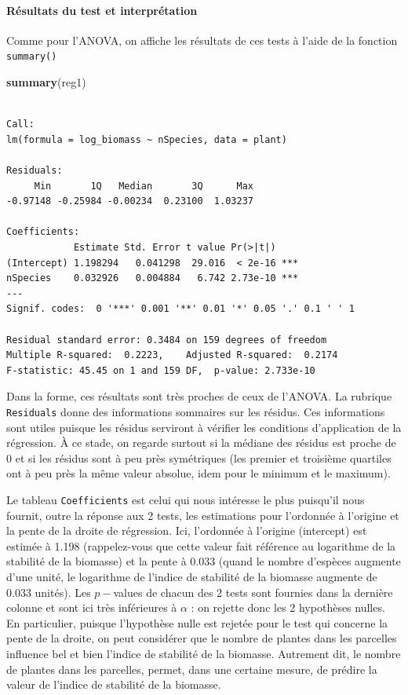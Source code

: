 \documentclass[a4paperpaper,]{article}
\newenvironment{Shaded}{\begin{snugshade}}{\end{snugshade}}
\newcommand{\KeywordTok}[1]{\textcolor[rgb]{0.12,0.11,0.11}{\textbf{#1}}}
\newcommand{\NormalTok}[1]{\textcolor[rgb]{0.12,0.11,0.11}{#1}}
\let\oldparagraph\paragraph
\renewcommand{\paragraph}[1]{\oldparagraph{#1}\mbox{}}
\begin{document}
\hypertarget{ruxe9sultats-du-test-et-interpruxe9tation-1}{%
\paragraph{Résultats du test et interprétation}\label{ruxe9sultats-du-test-et-interpruxe9tation-1}}

Comme pour l'ANOVA, on affiche les résultats de ces tests à l'aide de la fonction \texttt{summary()}

\begin{Shaded}
\begin{Highlighting}[]
\KeywordTok{summary}\NormalTok{(reg1)}
\end{Highlighting}
\end{Shaded}

\begin{verbatim}

Call:
lm(formula = log_biomass ~ nSpecies, data = plant)

Residuals:
     Min       1Q   Median       3Q      Max 
-0.97148 -0.25984 -0.00234  0.23100  1.03237 

Coefficients:
            Estimate Std. Error t value Pr(>|t|)    
(Intercept) 1.198294   0.041298  29.016  < 2e-16 ***
nSpecies    0.032926   0.004884   6.742 2.73e-10 ***
---
Signif. codes:  0 '***' 0.001 '**' 0.01 '*' 0.05 '.' 0.1 ' ' 1

Residual standard error: 0.3484 on 159 degrees of freedom
Multiple R-squared:  0.2223,    Adjusted R-squared:  0.2174 
F-statistic: 45.45 on 1 and 159 DF,  p-value: 2.733e-10
\end{verbatim}

Dans la forme, ces résultats sont très proches de ceux de l'ANOVA. La rubrique \texttt{Residuals} donne des informations sommaires sur les résidus. Ces informations sont utiles puisque les résidus serviront à vérifier les conditions d'application de la régression. À ce stade, on regarde surtout si la médiane des résidus est proche de 0 et si les résidus sont à peu près symétriques (les premier et troisième quartiles ont à peu près la même valeur absolue, idem pour le minimum et le maximum).

Le tableau \texttt{Coefficients} est celui qui nous intéresse le plus puisqu'il nous fournit, outre la réponse aux 2 tests, les estimations pour l'ordonnée à l'origine et la pente de la droite de régression. Ici, l'ordonnée à l'origine (intercept) est estimée à 1.198 (rappelez-vous que cette valeur fait référence au logarithme de la stabilité de la biomasse) et la pente à 0.033 (quand le nombre d'espèces augmente d'une unité, le logarithme de l'indice de stabilité de la biomasse augmente de 0.033 unités). Les \(p-\)values de chacun des 2 tests sont fournies dans la dernière colonne et sont ici très inférieures à \(\alpha\) : on rejette donc les 2 hypothèses nulles. En particulier, puisque l'hypothèse nulle est rejetée pour le test qui concerne la pente de la droite, on peut considérer que le nombre de plantes dans les parcelles influence bel et bien l'indice de stabilité de la biomasse. Autrement dit, le nombre de plantes dans les parcelles, permet, dans une certaine mesure, de prédire la valeur de l'indice de stabilité de la biomasse.
\end{document}
